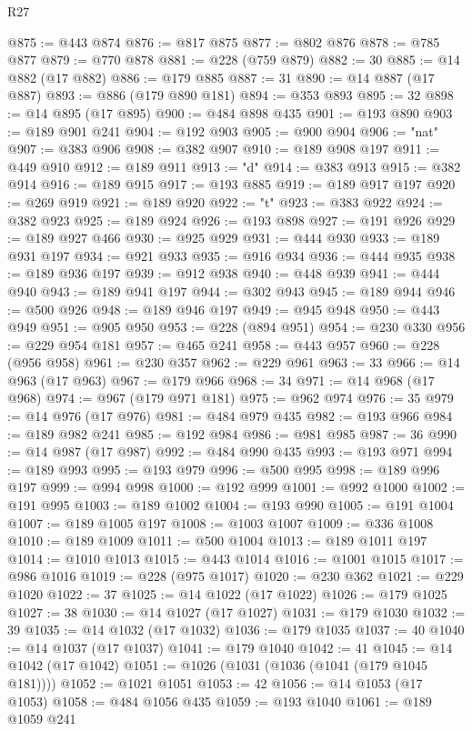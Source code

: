 \begin{lexlean}{R27}
\begin{coremodule}
@875 := @443 @874
@876 := @817 @875
@877 := @802 @876
@878 := @785 @877
@879 := @770 @878
@881 := @228 (@759 @879)
@882 := 30
@885 := @14 @882 (@17 @882)
@886 := @179 @885
@887 := 31
@890 := @14 @887 (@17 @887)
@893 := @886 (@179 @890 @181)
@894 := @353 @893
@895 := 32
@898 := @14 @895 (@17 @895)
@900 := @484 @898 @435
@901 := @193 @890
@903 := @189 @901 @241
@904 := @192 @903
@905 := @900 @904
@906 := "nat"
@907 := @383 @906
@908 := @382 @907
@910 := @189 @908 @197
@911 := @449 @910
@912 := @189 @911
@913 := "d"
@914 := @383 @913
@915 := @382 @914
@916 := @189 @915
@917 := @193 @885
@919 := @189 @917 @197
@920 := @269 @919
@921 := @189 @920
@922 := "t"
@923 := @383 @922
@924 := @382 @923
@925 := @189 @924
@926 := @193 @898
@927 := @191 @926
@929 := @189 @927 @466
@930 := @925 @929
@931 := @444 @930
@933 := @189 @931 @197
@934 := @921 @933
@935 := @916 @934
@936 := @444 @935
@938 := @189 @936 @197
@939 := @912 @938
@940 := @448 @939
@941 := @444 @940
@943 := @189 @941 @197
@944 := @302 @943
@945 := @189 @944
@946 := @500 @926
@948 := @189 @946 @197
@949 := @945 @948
@950 := @443 @949
@951 := @905 @950
@953 := @228 (@894 @951)
@954 := @230 @330
@956 := @229 @954 @181
@957 := @465 @241
@958 := @443 @957
@960 := @228 (@956 @958)
@961 := @230 @357
@962 := @229 @961
@963 := 33
@966 := @14 @963 (@17 @963)
@967 := @179 @966
@968 := 34
@971 := @14 @968 (@17 @968)
@974 := @967 (@179 @971 @181)
@975 := @962 @974
@976 := 35
@979 := @14 @976 (@17 @976)
@981 := @484 @979 @435
@982 := @193 @966
@984 := @189 @982 @241
@985 := @192 @984
@986 := @981 @985
@987 := 36
@990 := @14 @987 (@17 @987)
@992 := @484 @990 @435
@993 := @193 @971
@994 := @189 @993
@995 := @193 @979
@996 := @500 @995
@998 := @189 @996 @197
@999 := @994 @998
@1000 := @192 @999
@1001 := @992 @1000
@1002 := @191 @995
@1003 := @189 @1002
@1004 := @193 @990
@1005 := @191 @1004
@1007 := @189 @1005 @197
@1008 := @1003 @1007
@1009 := @336 @1008
@1010 := @189 @1009
@1011 := @500 @1004
@1013 := @189 @1011 @197
@1014 := @1010 @1013
@1015 := @443 @1014
@1016 := @1001 @1015
@1017 := @986 @1016
@1019 := @228 (@975 @1017)
@1020 := @230 @362
@1021 := @229 @1020
@1022 := 37
@1025 := @14 @1022 (@17 @1022)
@1026 := @179 @1025
@1027 := 38
@1030 := @14 @1027 (@17 @1027)
@1031 := @179 @1030
@1032 := 39
@1035 := @14 @1032 (@17 @1032)
@1036 := @179 @1035
@1037 := 40
@1040 := @14 @1037 (@17 @1037)
@1041 := @179 @1040
@1042 := 41
@1045 := @14 @1042 (@17 @1042)
@1051 := @1026 (@1031 (@1036 (@1041 (@179 @1045 @181))))
@1052 := @1021 @1051
@1053 := 42
@1056 := @14 @1053 (@17 @1053)
@1058 := @484 @1056 @435
@1059 := @193 @1040
@1061 := @189 @1059 @241

\end{coremodule}
\end{lexlean}
